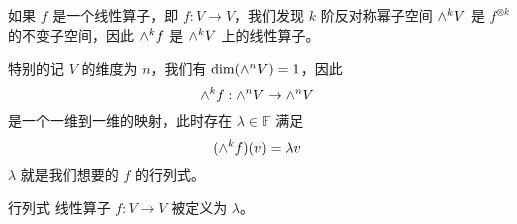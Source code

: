 
如果 $f$ 是一个线性算子，即 $f: V \to V$，我们发现 $k$ 阶反对称幂子空间 ${\large \wedge}^k V$ 是 $f^{\otimes k}$ 的不变子空间，因此 ${\large \wedge}^k f$ 是 ${\large \wedge}^k V$ 上的线性算子。

特别的记 $V$ 的维度为 $n$，我们有 $\dim({\large \wedge}^n V) = 1$，因此
\begin{equation}
{\large \wedge}^k f: {\large \wedge}^n V \to {\large \wedge}^n V~
\end{equation}
是一个一维到一维的映射，此时存在 $\lambda \in \mathbb{F}$ 满足
\begin{equation}
({\large \wedge}^k f)(v) = \lambda v~
\end{equation}
$\lambda$ 就是我们想要的 $f$ 的行列式。

\begin{definition}{行列式}
线性算子 $f: V \to V$ 被定义为 $\lambda$。
\end{definition}


